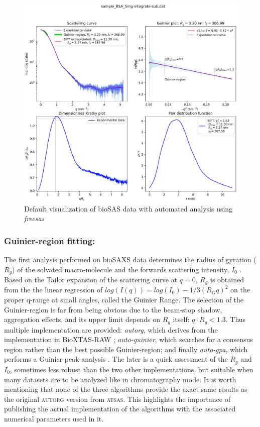 \documentclass[preprint]{iucr}              %
\begin{document}
\begin{figure}
\label{plot}
\includegraphics[width=12cm]{Figure_1.eps}
\caption{Default visualization of bioSAS data with automated analysis using \textit{freesas}}
\end{figure}

\subsubsection{Guinier-region fitting:}
The first analysis performed on bioSAXS data determines the radius of gyration ($R_g$) of the solvated macro-molecule and the forwards scattering intensity, $I_0$ \cite{guinier}.
Based on the Tailor expansion of the scattering curve at $q=0$, $R_g$ is obtained from the the linear regression of $log(I(q)) = log(I_0)-1/3 (R_{G}q)^{2}$ on the proper q-range at small angles, called the Guinier Range.
The selection of the Guinier-region is far from being obvious due to the beam-stop shadow, aggregation effects, and its upper limit depends on $R_g$ itself: $q \cdot R_g<1.3$.
Thus multiple implementation are provided: \textit{autorg}, which derives from the implementation in BioXTAS-RAW \cite{bioxtasraw}; \textit{auto-guinier}, which searches for a consensus region rather than the best possible Guinier-region; and finally \textit{auto-gpa}, which performs a Guinier-peak-analysis \cite{gpa}. 
The later is a quick assessment of the $R_g$ and $I_0$, sometimes less robust than the two other implementations, but suitable when many datasets are to be analyzed like in chromatography mode.
It is worth mentioning that none of the three algorithms provide the exact same results as the original \textsc{autorg} \cite{ATSAS2} version from \textsc{atsas}. 
This highlights the importance of publishing the actual implementation of the algorithms with the associated numerical parameters used in it.
  
\end{document}
